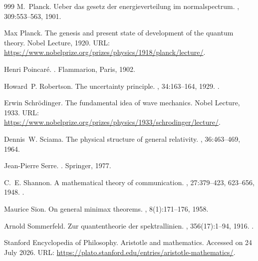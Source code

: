 \begin{thebibliography}{999}
M.~Planck.
\newblock Ueber das gesetz der energieverteilung im normalspectrum.
, 309:553--563, 1901.

Max Planck.
\newblock The genesis and present state of development of the quantum theory.
\newblock Nobel Lecture, 1920.
\newblock URL:
  \url{https://www.nobelprize.org/prizes/physics/1918/planck/lecture/}.

Henri Poincaré.
.
\newblock Flammarion, Paris, 1902.

Howard~P. Robertson.
\newblock The uncertainty principle.
, 34:163--164, 1929.
\newblock \href {https://doi.org/10.1103/PhysRev.34.163}
  {}.

Erwin Schrödinger.
\newblock The fundamental idea of wave mechanics.
\newblock Nobel Lecture, 1933.
\newblock URL:
  \url{https://www.nobelprize.org/prizes/physics/1933/schrodinger/lecture/}.

Dennis~W. Sciama.
\newblock The physical structure of general relativity.
, 36:463--469, 1964.

Jean-Pierre Serre.
.
\newblock Springer, 1977.

C.~E. Shannon.
\newblock A mathematical theory of communication.
, 27:379--423, 623--656, 1948.
\newblock \href {https://doi.org/10.1002/j.1538-7305.1948.tb01338.x}
  {}.

Maurice Sion.
\newblock On general minimax theorems.
, 8(1):171--176, 1958.

Arnold Sommerfeld.
\newblock Zur quantentheorie der spektrallinien.
, 356(17):1--94, 1916.
\newblock \href {https://doi.org/10.1002/andp.19163561702}
  {}.

{Stanford Encyclopedia of Philosophy}.
\newblock Aristotle and mathematics.
\newblock Accessed on 24 July 2026.
\newblock URL: \url{https://plato.stanford.edu/entries/aristotle-mathematics/}.


\end{thebibliography}
